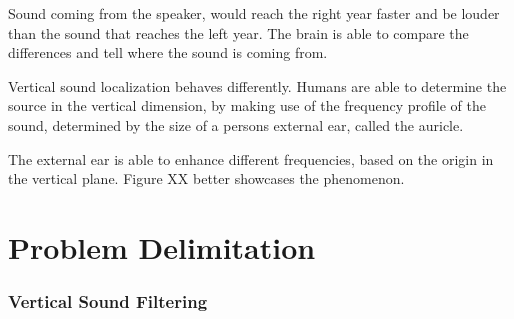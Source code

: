Sound coming from the speaker, would reach  the right year faster and be louder than 
the sound that reaches the left year. The brain is able to compare the differences
and tell where the sound is coming from.

Vertical sound localization behaves differently. Humans are able to determine the source
in the vertical dimension, by making use of the frequency profile of the sound, determined
by the size of a persons external ear, called the auricle.

The external ear is able to enhance different frequencies, based on the origin in the vertical
plane. Figure XX better showcases the phenomenon.


\section{Problem Delimitation}
\subsubsection{Vertical Sound Filtering}
